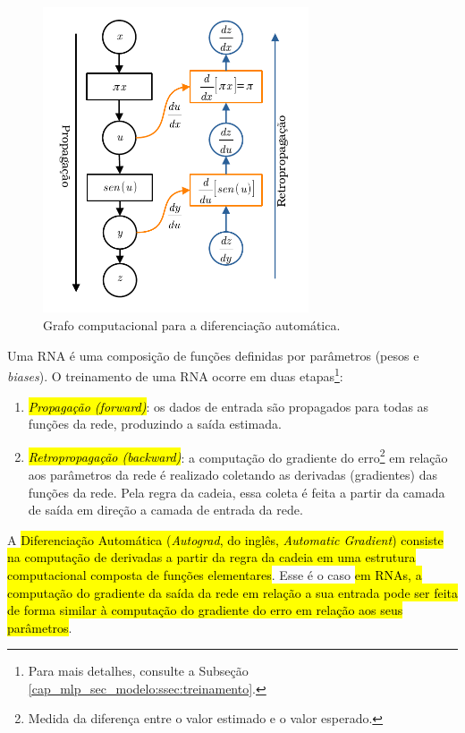 \begin{ex}
  \begin{figure}[H]
    \centering
    \includegraphics[width=0.7\textwidth]{cap_mlp/dados/fig_autograd_f1d/fig}
    \caption{Grafo computacional para a diferenciação automática.}
    \label{fig:autograd_f1d}
  \end{figure}
\end{ex}

Uma RNA é uma composição de funções definidas por parâmetros (pesos e \textit{biases}). O treinamento de uma RNA ocorre em duas etapas\footnote{Para mais detalhes, consulte a Subseção \ref{cap_mlp_sec_modelo:ssec:treinamento}.}:
\begin{enumerate}[1.]
\item \hl{\emph{Propagação (\textit{forward})}}: os dados de entrada são propagados para todas as funções da rede, produzindo a saída estimada.
\item \hl{\emph{Retropropagação (\textit{backward})}}: a computação do gradiente do erro\footnote{Medida da diferença entre o valor estimado e o valor esperado.} em relação aos parâmetros da rede é realizado coletando as derivadas (gradientes) das funções da rede. Pela regra da cadeia, essa coleta é feita a partir da camada de saída em direção a camada de entrada da rede.
\end{enumerate}

A \hl{Diferenciação Automática (\emph{Autograd}, do inglês, \textit{Automatic Gradient}) consiste na computação de derivadas a partir da regra da cadeia em uma estrutura computacional composta de funções elementares}. Esse é o caso \hl{em RNAs, a computação do gradiente da saída da rede em relação a sua entrada pode ser feita de forma similar à computação do gradiente do erro em relação aos seus parâmetros}.

